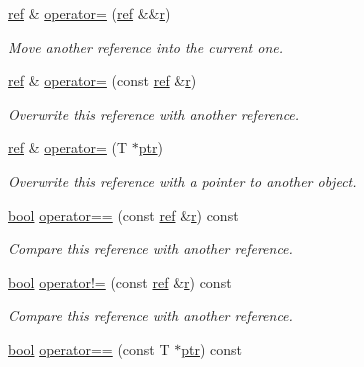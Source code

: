 \begin{DoxyCompactItemize}
\mbox{\hyperlink{classref}{ref}} \& \mbox{\hyperlink{classref_aed9cb8611b7e85e2a3ee5d05b13b9a0b}{operator=}} (\mbox{\hyperlink{classref}{ref}} \&\&\mbox{\hyperlink{_s_d_l__opengl_8h_a42ce7cdc612e53abee15043f80220d97}{r}})
\begin{DoxyCompactList}\small\item\em Move another reference into the current one. \end{DoxyCompactList}\item 
\mbox{\hyperlink{classref}{ref}} \& \mbox{\hyperlink{classref_a1155f824011414922d9b6a3b5d90c8d8}{operator=}} (const \mbox{\hyperlink{classref}{ref}} \&\mbox{\hyperlink{_s_d_l__opengl_8h_a42ce7cdc612e53abee15043f80220d97}{r}})
\begin{DoxyCompactList}\small\item\em Overwrite this reference with another reference. \end{DoxyCompactList}\item 
\mbox{\hyperlink{classref}{ref}} \& \mbox{\hyperlink{classref_a16ebd4ab3890e76d47cf7ef30f338690}{operator=}} (T $\ast$\mbox{\hyperlink{pystrtod_8h_a671b2e1a427060ad8b5362882ed58f5b}{ptr}})
\begin{DoxyCompactList}\small\item\em Overwrite this reference with a pointer to another object. \end{DoxyCompactList}\item 
\mbox{\hyperlink{asdl_8h_af6a258d8f3ee5206d682d799316314b1}{bool}} \mbox{\hyperlink{classref_a8a96aae6d9787e988ff148d1dd9a773d}{operator==}} (const \mbox{\hyperlink{classref}{ref}} \&\mbox{\hyperlink{_s_d_l__opengl_8h_a42ce7cdc612e53abee15043f80220d97}{r}}) const
\begin{DoxyCompactList}\small\item\em Compare this reference with another reference. \end{DoxyCompactList}\item 
\mbox{\hyperlink{asdl_8h_af6a258d8f3ee5206d682d799316314b1}{bool}} \mbox{\hyperlink{classref_ae4fb583b5cdbd8659c8dfc91ca5ba4f2}{operator!=}} (const \mbox{\hyperlink{classref}{ref}} \&\mbox{\hyperlink{_s_d_l__opengl_8h_a42ce7cdc612e53abee15043f80220d97}{r}}) const
\begin{DoxyCompactList}\small\item\em Compare this reference with another reference. \end{DoxyCompactList}\item 
\mbox{\hyperlink{asdl_8h_af6a258d8f3ee5206d682d799316314b1}{bool}} \mbox{\hyperlink{classref_a6131b1c40dd6977c7e005826ba660213}{operator==}} (const T $\ast$\mbox{\hyperlink{pystrtod_8h_a671b2e1a427060ad8b5362882ed58f5b}{ptr}}) const

\end{DoxyCompactItemize}
